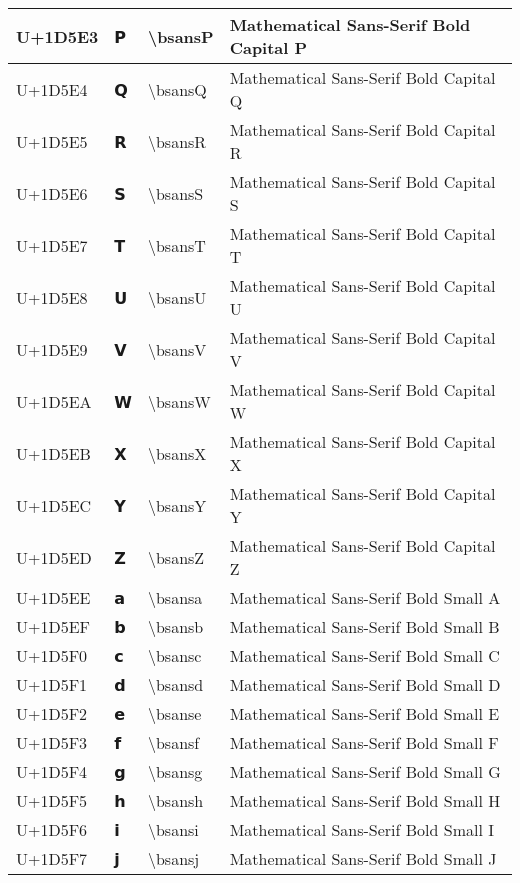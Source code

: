 \begin{table}[h]
\begin{tabulary}{\linewidth}{|L|L|L|L|}
\hline
U+1D5E3 & 𝗣 & {\textbackslash}bsansP & Mathematical Sans-Serif Bold Capital P \\
\hline
U+1D5E4 & 𝗤 & {\textbackslash}bsansQ & Mathematical Sans-Serif Bold Capital Q \\
\hline
U+1D5E5 & 𝗥 & {\textbackslash}bsansR & Mathematical Sans-Serif Bold Capital R \\
\hline
U+1D5E6 & 𝗦 & {\textbackslash}bsansS & Mathematical Sans-Serif Bold Capital S \\
\hline
U+1D5E7 & 𝗧 & {\textbackslash}bsansT & Mathematical Sans-Serif Bold Capital T \\
\hline
U+1D5E8 & 𝗨 & {\textbackslash}bsansU & Mathematical Sans-Serif Bold Capital U \\
\hline
U+1D5E9 & 𝗩 & {\textbackslash}bsansV & Mathematical Sans-Serif Bold Capital V \\
\hline
U+1D5EA & 𝗪 & {\textbackslash}bsansW & Mathematical Sans-Serif Bold Capital W \\
\hline
U+1D5EB & 𝗫 & {\textbackslash}bsansX & Mathematical Sans-Serif Bold Capital X \\
\hline
U+1D5EC & 𝗬 & {\textbackslash}bsansY & Mathematical Sans-Serif Bold Capital Y \\
\hline
U+1D5ED & 𝗭 & {\textbackslash}bsansZ & Mathematical Sans-Serif Bold Capital Z \\
\hline
U+1D5EE & 𝗮 & {\textbackslash}bsansa & Mathematical Sans-Serif Bold Small A \\
\hline
U+1D5EF & 𝗯 & {\textbackslash}bsansb & Mathematical Sans-Serif Bold Small B \\
\hline
U+1D5F0 & 𝗰 & {\textbackslash}bsansc & Mathematical Sans-Serif Bold Small C \\
\hline
U+1D5F1 & 𝗱 & {\textbackslash}bsansd & Mathematical Sans-Serif Bold Small D \\
\hline
U+1D5F2 & 𝗲 & {\textbackslash}bsanse & Mathematical Sans-Serif Bold Small E \\
\hline
U+1D5F3 & 𝗳 & {\textbackslash}bsansf & Mathematical Sans-Serif Bold Small F \\
\hline
U+1D5F4 & 𝗴 & {\textbackslash}bsansg & Mathematical Sans-Serif Bold Small G \\
\hline
U+1D5F5 & 𝗵 & {\textbackslash}bsansh & Mathematical Sans-Serif Bold Small H \\
\hline
U+1D5F6 & 𝗶 & {\textbackslash}bsansi & Mathematical Sans-Serif Bold Small I \\
\hline
U+1D5F7 & 𝗷 & {\textbackslash}bsansj & Mathematical Sans-Serif Bold Small J \\

\end{tabulary}
\end{table}
